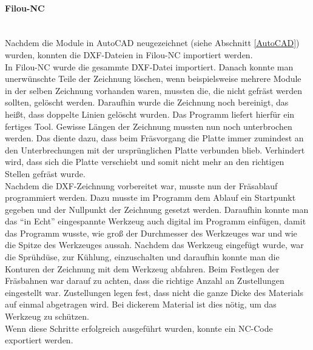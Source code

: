     \paragraph{Filou-NC}\mbox{}\\
    Nachdem die Module in AutoCAD neugezeichnet (siehe Abschnitt \ref{AutoCAD}) wurden, konnten die DXF-Dateien in Filou-NC importiert werden.\\
    In Filou-NC wurde die gesammte DXF-Datei importiert. Danach konnte man unerwünschte Teile der Zeichnung löschen, wenn beispielsweise mehrere Module in der selben Zeichnung vorhanden waren, mussten die, die nicht gefräst werden sollten, gelöscht werden. Daraufhin wurde die Zeichnung noch bereinigt, das heißt, dass doppelte Linien gelöscht wurden. Das Programm liefert hierfür ein fertiges Tool. Gewisse Längen der Zeichnung mussten nun noch unterbrochen werden. Das diente dazu, dass beim Fräsvorgang die Platte immer zumindest an den Unterbrechungen mit der ursprünglichen Platte verbunden blieb. Verhindert wird, dass sich die Platte verschiebt und somit nicht mehr an den richtigen Stellen gefräst wurde.\\
    Nachdem die DXF-Zeichnung vorbereitet war, musste nun der Fräsablauf programmiert werden. Dazu musste im Programm dem Ablauf ein Startpunkt gegeben und der Nullpunkt der Zeichnung gesetzt werden. Daraufhin konnte man das \enquote{in Echt} eingespannte Werkzeug auch digital im Programm einfügen, damit das Programm wusste, wie groß der Durchmesser des Werkzeuges war und wie die Spitze des Werkzeuges aussah. Nachdem das Werkzeug eingefügt wurde, war die Sprühdüse, zur Kühlung, einzuschalten und daraufhin konnte man die Konturen der Zeichnung mit dem Werkzeug abfahren. Beim Festlegen der Fräsbahnen war darauf zu achten, dass die richtige Anzahl an Zustellungen eingestellt war. Zustellungen legen fest, dass nicht die ganze Dicke des Materials auf einmal abgetragen wird. Bei dickerem Material ist dies nötig, um das Werkzeug zu schützen.\\
    Wenn diese Schritte erfolgreich ausgeführt wurden, konnte ein NC-Code exportiert werden. 
